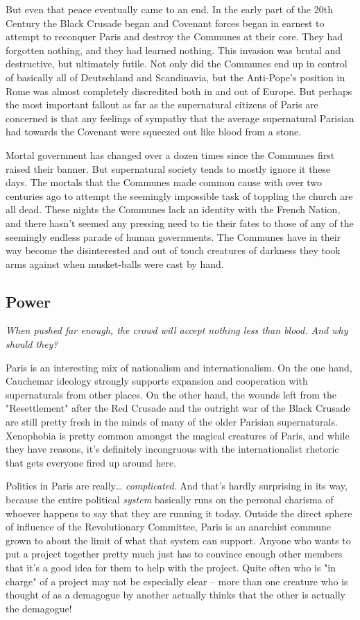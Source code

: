 But even that peace eventually came to an end. In the early part of the 20th Century the Black Crusade began and Covenant forces began in earnest to attempt to reconquer Paris and destroy the Communes at their core. They had forgotten nothing, and they had learned nothing. This invasion was brutal and destructive, but ultimately futile. Not only did the Communes end up in control of basically all of Deutschland and Scandinavia, but the Anti-Pope's position in Rome was almost completely discredited both in and out of Europe. But perhaps the most important fallout as far as the supernatural citizens of Paris are concerned is that any feelings of sympathy that the average supernatural Parisian had towards the Covenant were squeezed out like blood from a stone.

Mortal government has changed over a dozen times since the Communes first raised their banner. But supernatural society tends to mostly ignore it these days. The mortals that the Communes made common cause with over two centuries ago to attempt the seemingly impossible task of toppling the church are all dead. These nights the Communes lack an identity with the French Nation, and there hasn't seemed any pressing need to tie their fates to those of any of the seemingly endless parade of human governments. The Communes have in their way become the disinterested and out of touch creatures of darkness they took arms against when musket-balls were cast by hand.

\subsection{Power}
\textit{When pushed far enough, the crowd will accept nothing less than blood. And why should they?}

Paris is an interesting mix of nationalism and internationalism. On the one hand, Cauchemar ideology strongly supports expansion and cooperation with supernaturals from other places. On the other hand, the wounds left from the "Resettlement" after the Red Crusade and the outright war of the Black Crusade are still pretty fresh in the minds of many of the older Parisian supernaturals. Xenophobia is pretty common amongst the magical creatures of Paris, and while they have reasons, it's definitely incongruous with the internationalist rhetoric that gets everyone fired up around here.

Politics in Paris are really\ldots{} \textit{complicated}. And that's hardly surprising in its way, because the entire political \textit{system} basically runs on the personal charisma of whoever happens to say that they are running it today. Outside the direct sphere of influence of the Revolutionary Committee, Paris is an anarchist commune grown to about the limit of what that system can support. Anyone who wants to put a project together pretty much just has to convince enough other members that it's a good idea for them to help with the project. Quite often who is "in charge" of a project may not be especially clear -- more than one creature who is thought of as a demagogue by another actually thinks that the other is actually the demagogue!

